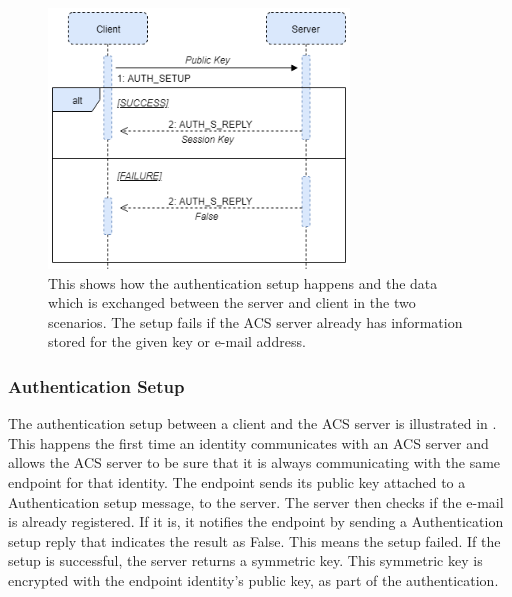 	\begin{figure}[th]
	  \centering
	  \includegraphics[width=80mm]{Figures/ACS_Prot/Auth_Setup}
	  \decoRule
	  \caption[WS protocol: Authentication setup]{This shows how the authentication setup happens and the data which is exchanged between the server and client in the two scenarios. The setup fails if the ACS server already has information stored for the given key or e-mail address.}
	  \label{fig:prot_setup}
	\end{figure}	

	\subsubsection*{Authentication Setup}
	The authentication setup between a client and the ACS server is illustrated in . This happens the first time an identity communicates with an ACS server and allows the ACS server to be sure that it is always communicating with the same endpoint for that identity. The endpoint sends its public key attached to a Authentication setup message, to the server. The server then checks if the e-mail is already registered. If it is, it notifies the endpoint by sending a Authentication setup reply that indicates the result as False. This means the setup failed. If the setup is successful, the server returns a symmetric key. This symmetric key is encrypted with the endpoint identity's public key, as part of the authentication. %

